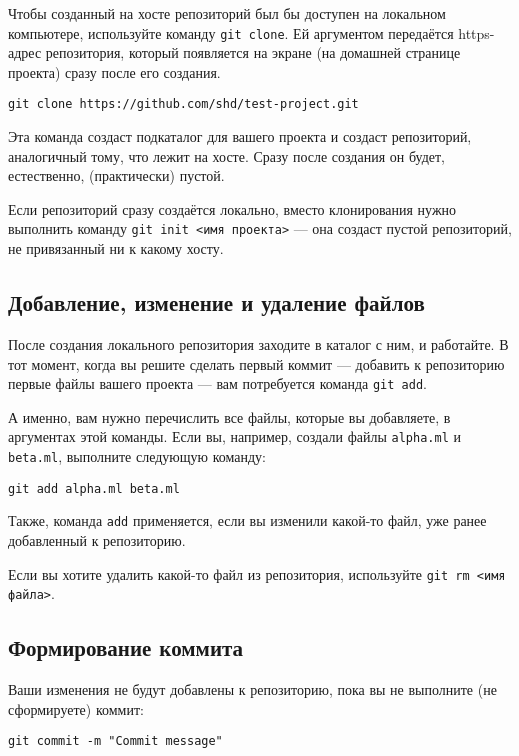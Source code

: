\documentclass[12pt]{article}
\begin{document}
Чтобы созданный на хосте репозиторий был бы доступен на локальном
компьютере, используйте команду \verb!git clone!. Ей аргументом
передаётся https-адрес репозитория, который появляется на экране
(на домашней странице проекта) сразу после его создания.

\begin{verbatim}
git clone https://github.com/shd/test-project.git
\end{verbatim}

Эта команда создаст подкаталог для вашего проекта и создаст репозиторий,
аналогичный тому, что лежит на хосте. Сразу после создания он
будет, естественно, (практически) пустой. 

Если репозиторий сразу создаётся локально, вместо клонирования
нужно выполнить команду \verb!git init <имя проекта>! --- она
создаст пустой репозиторий, не привязанный ни к какому хосту.

\subsection{Добавление, изменение и удаление файлов}

После создания локального репозитория заходите в каталог с ним,
и работайте. В тот момент, когда вы решите сделать первый коммит ---
добавить к репозиторию первые файлы вашего проекта --- вам потребуется
команда \verb!git add!.

А именно, вам нужно перечислить все файлы, которые вы добавляете,
в аргументах этой команды. Если вы, например, создали файлы 
\verb!alpha.ml! и \verb!beta.ml!, выполните следующую команду:

\begin{verbatim}
git add alpha.ml beta.ml
\end{verbatim}

Также, команда \verb!add! применяется, если вы изменили 
какой-то файл, уже ранее добавленный к репозиторию.

Если вы хотите удалить какой-то файл из репозитория, используйте
\verb!git rm <имя файла>!.

\subsection{Формирование коммита}

Ваши изменения не будут добавлены к репозиторию, пока вы не выполните
(не сформируете) коммит: 

\begin{verbatim}
git commit -m "Commit message"
\end{verbatim}
\end{document}
